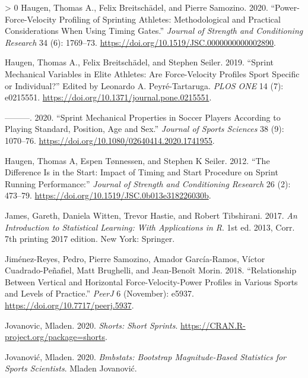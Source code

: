 \documentclass[fleqn,10pt,lineno]{wlpeerj} %
\newlength{\cslhangindent}
\newenvironment{CSLReferences}[3] %
 {%
  \setlength{\parindent}{0pt}
  \ifodd #1 \everypar{\setlength{\hangindent}{\cslhangindent}}\ignorespaces\fi
  \ifnum #2 > 0
  \setlength{\parskip}{#2\baselineskip}
  \fi
 }%
 {}
\begin{document}
\begin{CSLReferences}{1}{0}
\leavevmode\hypertarget{ref-haugenPowerForceVelocityProfilingSprinting2020}{}%
Haugen, Thomas A., Felix Breitschädel, and Pierre Samozino. 2020. {``Power-{Force}-{Velocity Profiling} of {Sprinting Athletes}: {Methodological} and {Practical Considerations When Using Timing Gates}.''} \emph{Journal of Strength and Conditioning Research} 34 (6): 1769--73. \url{https://doi.org/10.1519/JSC.0000000000002890}.

\leavevmode\hypertarget{ref-haugenSprintMechanicalVariables2019}{}%
Haugen, Thomas A., Felix Breitschädel, and Stephen Seiler. 2019. {``Sprint Mechanical Variables in Elite Athletes: {Are} Force-Velocity Profiles Sport Specific or Individual?''} Edited by Leonardo A. Peyré-Tartaruga. \emph{PLOS ONE} 14 (7): e0215551. \url{https://doi.org/10.1371/journal.pone.0215551}.

\leavevmode\hypertarget{ref-haugenSprintMechanicalProperties2020}{}%
---------. 2020. {``Sprint Mechanical Properties in Soccer Players According to Playing Standard, Position, Age and Sex.''} \emph{Journal of Sports Sciences} 38 (9): 1070--76. \url{https://doi.org/10.1080/02640414.2020.1741955}.

\leavevmode\hypertarget{ref-haugenDifferenceStartImpact2012}{}%
Haugen, Thomas A, Espen Tønnessen, and Stephen K Seiler. 2012. {``The {Difference Is} in the {Start}: {Impact} of {Timing} and {Start Procedure} on {Sprint Running Performance}:''} \emph{Journal of Strength and Conditioning Research} 26 (2): 473--79. \url{https://doi.org/10.1519/JSC.0b013e318226030b}.

\leavevmode\hypertarget{ref-jamesIntroductionStatisticalLearning2017}{}%
James, Gareth, Daniela Witten, Trevor Hastie, and Robert Tibshirani. 2017. \emph{An {Introduction} to {Statistical Learning}: With {Applications} in {R}}. 1st ed. 2013, Corr. 7th printing 2017 edition. {New York}: {Springer}.

\leavevmode\hypertarget{ref-jimenez-reyesRelationshipVerticalHorizontal2018}{}%
Jiménez-Reyes, Pedro, Pierre Samozino, Amador García-Ramos, Víctor Cuadrado-Peñafiel, Matt Brughelli, and Jean-Benoît Morin. 2018. {``Relationship Between Vertical and Horizontal Force-Velocity-Power Profiles in Various Sports and Levels of Practice.''} \emph{PeerJ} 6 (November): e5937. \url{https://doi.org/10.7717/peerj.5937}.

\leavevmode\hypertarget{ref-R-shorts}{}%
Jovanovic, Mladen. 2020. \emph{Shorts: Short Sprints}. \url{https://CRAN.R-project.org/package=shorts}.

\leavevmode\hypertarget{ref-jovanovicBmbstatsBootstrapMagnitudebased2020}{}%
Jovanović, Mladen. 2020. \emph{Bmbstats: {Bootstrap Magnitude}-Based {Statistics} for {Sports Scientists}}. {Mladen Jovanović}.


\end{CSLReferences}
\end{document}
